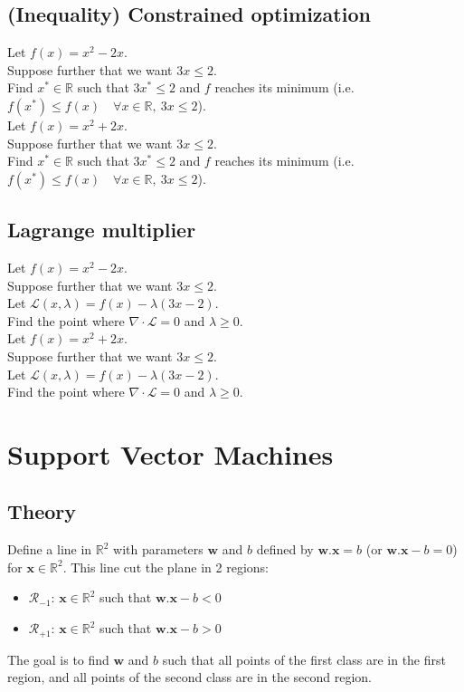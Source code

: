 \documentclass[]{article}
\newcommand{\R}{\mathbb{R}}
\begin{document}
	\subsection{(Inequality) Constrained optimization}
	Let $f(x) = x^2-2x$.\\
	Suppose further that we want $3x \leq 2$.\\
	Find $x^* \in \R$ such that $3x^* \leq 2$ and $f$ reaches its minimum (i.e. $f(x^*) \leq f(x) \quad \forall x \in \R,\ 3x \leq 2$).
	\vspace{0.5cm}
	\\
	Let $f(x) = x^2+2x$.\\
	Suppose further that we want $3x \leq 2$.\\
	Find $x^* \in \R$ such that $3x^* \leq 2$ and $f$ reaches its minimum (i.e. $f(x^*) \leq f(x) \quad \forall x \in \R,\ 3x \leq 2$).
	
	\subsection{Lagrange multiplier}
	Let $f(x) = x^2-2x$.\\
	Suppose further that we want $3x \leq 2$.\\
	Let $\mathcal{L}(x,\lambda) = f(x) - \lambda (3x - 2)$.\\
	Find the point where $\nabla \cdot \mathcal{L} = 0$ and $\lambda \geq 0$.
	\vspace{0.5cm}
	\\
	Let $f(x) = x^2+2x$.\\
	Suppose further that we want $3x \leq 2$.\\
	Let $\mathcal{L}(x,\lambda) = f(x) - \lambda (3x - 2)$.\\
	Find the point where $\nabla \cdot \mathcal{L} = 0$ and $\lambda \geq 0$.
	
	
	
	
	
	\section{Support Vector Machines}
	\subsection{Theory}
	Define a line in $\R^2$ with parameters $\mathbf{w}$ and $b$ defined by $\mathbf{w}.\mathbf{x} = b$ (or $\mathbf{w}.\mathbf{x} - b = 0$) for $\mathbf{x} \in \R^2$.
	This line cut the plane in 2 regions:
	\begin{itemize}
		\item $\mathcal{R}_{-1}$: $\mathbf{x} \in \R^2$ such that $\mathbf{w}.\mathbf{x} - b < 0$
		\item $\mathcal{R}_{+1}$: $\mathbf{x} \in \R^2$ such that $\mathbf{w}.\mathbf{x} - b > 0$
	\end{itemize}
	The goal is to find $\mathbf{w}$ and $b$ such that all points of the first class are in the first region, and all points of the second class are in the second region.
	
\end{document}
